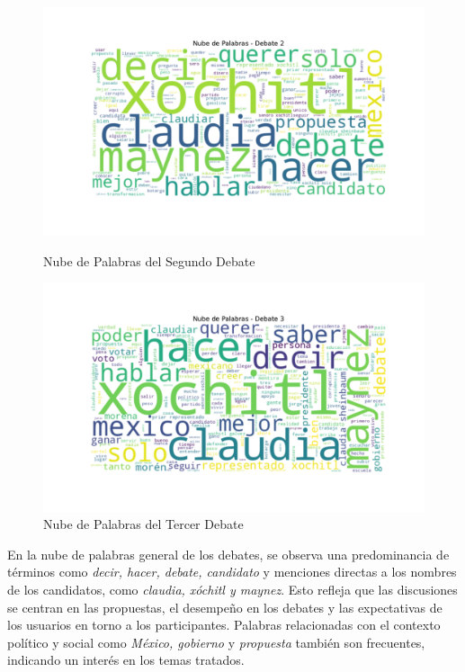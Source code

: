 \documentclass[10pt, a4paper]{article}
\begin{document}
	
	\begin{figure}[h!]
		\centering
		\begin{minipage}{0.49\textwidth} %
			\includegraphics[width=\linewidth]{nube_palabras_debate_2.pdf} 
			\vspace{-10mm}
			\caption{Nube de Palabras del Segundo Debate}
			\label{fig:nubeDebate2}
		\end{minipage}
		\hfill %
		\begin{minipage}{0.49\textwidth}
			\includegraphics[width=\linewidth]{nube_palabras_debate_3.pdf}
			\vspace{-10mm}
			\caption{Nube de Palabras del Tercer Debate}
			\label{fig:nubeDebate3}
		\end{minipage}
	\end{figure}

	En la nube de palabras general de los debates, se observa una predominancia de términos como \textit{decir, hacer, debate, candidato} y menciones directas a los nombres de los candidatos, como \textit{claudia, xóchitl y maynez}. Esto refleja que las discusiones se centran en las propuestas, el desempeño en los debates y las expectativas de los usuarios en torno a los participantes. Palabras relacionadas con el contexto político y social como \textit{México, gobierno} y \textit{propuesta} también son frecuentes, indicando un interés en los temas tratados.
	
\end{document}
